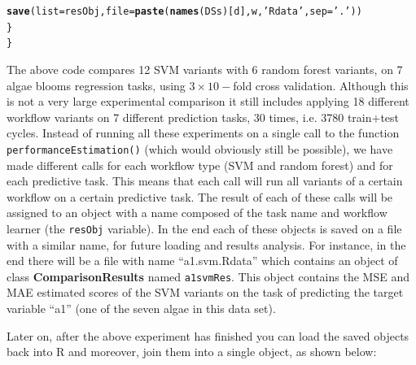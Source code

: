 \documentclass[10pt,a4paper]{article}\usepackage[]{graphicx}\usepackage[]{color}
\makeatletter
\newcommand{\hlstr}[1]{\textcolor[rgb]{0.192,0.494,0.8}{#1}}%
\newcommand{\hlstd}[1]{\textcolor[rgb]{0.345,0.345,0.345}{#1}}%
\newcommand{\hlkwc}[1]{\textcolor[rgb]{0.333,0.667,0.333}{#1}}%
\newcommand{\hlkwd}[1]{\textcolor[rgb]{0.737,0.353,0.396}{\textbf{#1}}}%
\newenvironment{kframe}{%
 \def\at@end@of@kframe{}%
 \ifinner\ifhmode%
  \def\at@end@of@kframe{\end{minipage}}%
  \begin{minipage}{\columnwidth}%
 \fi\fi%
 \def\FrameCommand##1{\hskip\@totalleftmargin \hskip-\fboxsep
 \colorbox{shadecolor}{##1}\hskip-\fboxsep
     \hskip-\linewidth \hskip-\@totalleftmargin \hskip\columnwidth}%
 \MakeFramed {\advance\hsize-\width
   \@totalleftmargin\z@ \linewidth\hsize
   \@setminipage}}%
 {\par\unskip\endMakeFramed%
 \at@end@of@kframe}
\newenvironment{knitrout}{}{} %
\makeatother
\begin{document}
\begin{knitrout}
\begin{kframe}
\begin{alltt}
    \hlkwd{save}\hlstd{(}\hlkwc{list}\hlstd{=resObj,}\hlkwc{file}\hlstd{=}\hlkwd{paste}\hlstd{(}\hlkwd{names}\hlstd{(DSs)[d],w,}\hlstr{'Rdata'}\hlstd{,}\hlkwc{sep}\hlstd{=}\hlstr{'.'}\hlstd{))}
  \hlstd{\}}
\hlstd{\}}
\end{alltt}
\end{kframe}
\end{knitrout}

The above code compares 12 SVM variants with 6 random forest variants,
on 7 algae blooms regression tasks, using $3\times 10-$fold cross
validation. Although this is not a very large experimental comparison
it still includes applying 18 different workflow variants on 7
different prediction tasks, 30 times, i.e. 3780 train+test
cycles. Instead of running all these experiments on a single call to
the function \texttt{performanceEstimation()} (which would obviously
still be possible), we have made different calls for each workflow
type (SVM and random forest) and for each predictive task. This
means that each call will run all variants of a certain workflow on a
certain predictive task. The result of each of these calls will be
assigned to an object with a name composed of the task name and
workflow learner (the \texttt{resObj} variable). In the end each of
these objects is saved on a file with a similar name, for future
loading and results analysis. For instance, in the end there will be a
file with name ``a1.svm.Rdata'' which contains an object of class
\textbf{ComparisonResults} named \texttt{a1svmRes}. This object
contains the MSE and MAE estimated scores of the SVM variants on the
task of predicting the target variable ``a1'' (one of the seven algae
in this data set).

Later on, after the above experiment has finished you can load the saved objects back 
into R and moreover, join them into a single object, as shown below:
\end{document}
